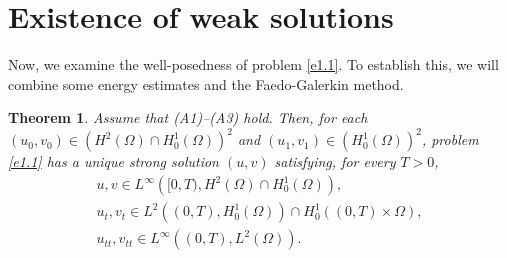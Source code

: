 \documentclass[11pt]{article}
\numberwithin{equation}{section}
\newtheorem{theorem}{Theorem}[section]
\begin{document}
\section{Existence of weak solutions}
Now, we examine the well-posedness of problem \eqref{e1.1}. To establish this, we will combine some energy estimates and the Faedo-Galerkin method.

\begin{theorem} \label{thm3}
 Assume that {\rm (A1)--(A3)} hold.
Then, for each $ (u_0,v_0) \in \left( H^2(\Omega) \cap H^1_0(\Omega)\right)^2$ and
$(u_1,v_1) \in \left( H^1_0(\Omega)\right)^2$, problem \eqref{e1.1} has a unique strong solution
$(u, v)$ satisfying, for every $T > 0$,
\begin{gather*}
u, v \in L^{\infty}\left( [0, T), H^2(\Omega) \cap H^1_0(\Omega)\right),\\
u_{t}, v_{t} \in L^2\left( (0, T), H^1_0(\Omega)\right)\cap H^1_0 \left( (0, T)\times \Omega\right),\\
u_{tt}, v_{tt} \in L^{\infty}\left( (0, T), L^2(\Omega)\right).
\end{gather*}
 \end{theorem}
\end{document}

